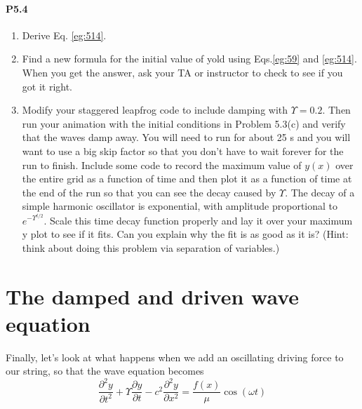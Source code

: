 \documentclass{book}
\theoremstyle{plain}
\theoremstyle{definition}
\numberwithin{exm}{chapter}
\theoremstyle{remark}
\theoremstyle{summary}
\theoremstyle{overview}
\begin{document}
\paragraph*{P5.4} 
\begin{enumerate}[label=(\alph*)]
	\item Derive Eq. \eqref{eg:514}.
	\item Find a new formula for the initial value of yold using Eqs.\eqref{eg:59} and
\eqref{eg:514}. When you get the answer, ask your TA or instructor to check to
see if you got it right.
\item Modify your staggered leapfrog code to include damping with $ \Upsilon = 0.2$.
Then run your animation with the initial conditions in Problem 5.3(c)
and verify that the waves damp away. You will need to run for about
25 s and you will want to use a big skip factor so that you don\rq t have
to wait forever for the run to finish. Include some code to record the
maximum value of $y(x)$ over the entire grid as a function of time and
then plot it as a function of time at the end of the run so that you can
see the decay caused by $\Upsilon$. The decay of a simple harmonic oscillator
is exponential, with amplitude proportional to $e^{−\Upsilon^{ t/2}}$. Scale this time
decay function properly and lay it over your maximum y plot to see if
it fits. Can you explain why the fit is as good as it is? (Hint: think about
doing this problem via separation of variables.)

\end{enumerate}
\section*{The damped and driven wave equation}
Finally, let\rq s look at what happens when we add an oscillating driving force to our
string, so that the wave equation becomes
\begin{equation}\label{eq:515}
\frac{\partial^2 y}{\partial t^2} + \Upsilon \frac{\partial y}{\partial t}-c^2\frac{\partial^2 y}{\partial x^2} = \frac{f(x)}{\mu} \cos(\omega t )
\end{equation}
\end{document}
